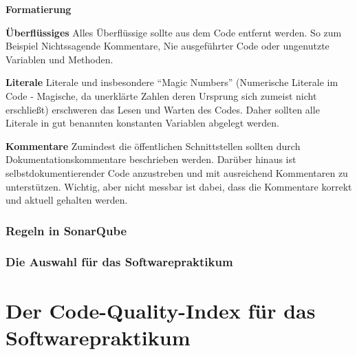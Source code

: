 \documentclass[da,ngerman]{stthesis}
\begin{document}
\begin{labeling}{\textbf{Formatierung}}
					\item [\textbf{Überflüssiges}] Alles Überflüssige sollte aus dem Code entfernt werden. So zum Beispiel Nichtssagende Kommentare, Nie ausgeführter Code oder ungenutzte Variablen und Methoden. 
					\item [\textbf{Literale}] Literale und insbesondere "`Magic Numbers"' (Numerische Literale im Code - Magische, da unerklärte Zahlen deren Ursprung sich zumeist nicht erschließt) erschweren das Lesen und Warten des Codes. Daher sollten alle Literale in gut benannten konstanten Variablen abgelegt werden.	
					\item [\textbf{Kommentare}]	Zumindest die öffentlichen Schnittstellen sollten durch Dokumentationskommentare beschrieben werden. Darüber hinaus ist selbstdokumentierender Code anzustreben und mit ausreichend Kommentaren zu unterstützen. Wichtig, aber nicht messbar ist dabei, dass die Kommentare korrekt und aktuell gehalten werden.			
				\end{labeling}
			\subsection{Regeln in SonarQube}
			\subsection{Die Auswahl für das Softwarepraktikum}
				
	\chapter{Der Code-Quality-Index für das Softwarepraktikum} \label{indexchapter}
  	\backmatter
  
  	\appendix
  	
  
\end{document}
